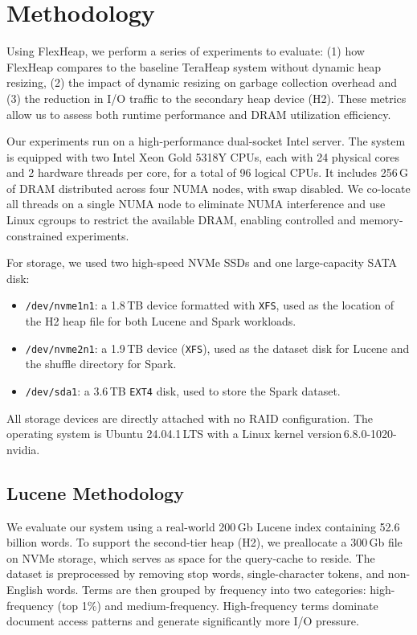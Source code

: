 \section{Methodology}

Using FlexHeap, we perform a series of experiments to evaluate: 
(1) how FlexHeap compares to the baseline TeraHeap system without dynamic heap resizing,
(2) the impact of dynamic resizing on garbage collection overhead and
(3) the reduction in I/O traffic to the secondary heap device (H2).
These metrics allow us to assess both runtime performance and DRAM utilization efficiency.

Our experiments run on a high-performance dual-socket Intel server.
The system is equipped with two Intel Xeon Gold 5318Y CPUs, each with 24 physical cores 
and 2 hardware threads per core, for a total of 96 logical CPUs. It includes 256\,G of DRAM 
distributed across four NUMA nodes, with swap disabled. We co-locate all threads on a single
NUMA node to eliminate NUMA interference and use Linux cgroups to restrict the available DRAM,
enabling controlled and memory-constrained experiments.

For storage, we used two high-speed NVMe SSDs and one large-capacity SATA disk:
\begin{itemize}
  \item \texttt{/dev/nvme1n1}: a 1.8\,TB device formatted with \texttt{XFS}, used as the location of 
                               the H2 heap file for both Lucene and Spark workloads.
  \item \texttt{/dev/nvme2n1}: a 1.9\,TB device (\texttt{XFS}), used as the dataset disk for Lucene 
                               and the shuffle directory for Spark.
  \item \texttt{/dev/sda1}: a 3.6\,TB \texttt{EXT4} disk, used to store the Spark dataset.
\end{itemize}

All storage devices are directly attached with no RAID configuration. The operating system is Ubuntu 
24.04.1\,LTS with a Linux kernel version\,6.8.0-1020-nvidia.
\subsection{Lucene Methodology}

We evaluate our system using a real-world 200\,Gb Lucene index containing 52.6 billion words. 
To support the second-tier heap (H2), we preallocate a 300\,Gb file on NVMe storage, which serves as space 
for the query-cache to reside.
The dataset is preprocessed by removing stop words, single-character tokens, and non-English words. 
Terms are then grouped by frequency into two categories: high-frequency (top 1\%) and medium-frequency. 
High-frequency terms dominate document access patterns and generate significantly more I/O pressure.


